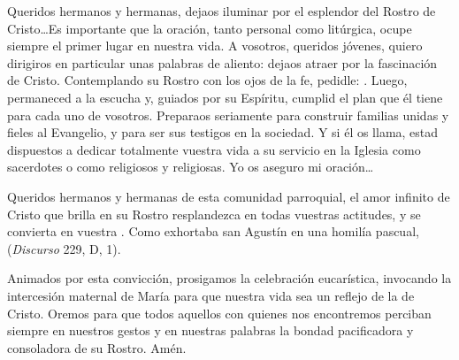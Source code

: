 \begin{body}
Queridos hermanos y hermanas, dejaos iluminar por el esplendor del Rostro de Cristo\ldots Es importante que la oración, tanto personal como litúrgica, ocupe siempre el primer lugar en nuestra vida. A vosotros, queridos jóvenes, quiero dirigiros en particular unas palabras de aliento: dejaos atraer por la fascinación de Cristo. Contemplando su Rostro con los ojos de la fe, pedidle: . Luego, permaneced a la escucha y, guiados por su Espíritu, cumplid el plan que él tiene para cada uno de vosotros. Preparaos seriamente para construir familias unidas y fieles al Evangelio, y para ser sus testigos en la sociedad. Y si él os llama, estad dispuestos a dedicar totalmente vuestra vida a su servicio en la Iglesia como sacerdotes o como religiosos y religiosas. Yo os aseguro mi oración\ldots

Queridos hermanos y hermanas de esta comunidad parroquial, el amor infinito de Cristo que brilla en su Rostro resplandezca en todas vuestras actitudes, y se convierta en vuestra . Como exhortaba san Agustín en una homilía pascual,  (\textit{Discurso} 229, D, 1).

Animados por esta convicción, prosigamos la celebración eucarística, invocando la intercesión maternal de María para que nuestra vida sea un reflejo de la de Cristo. Oremos para que todos aquellos con quienes nos encontremos perciban siempre en nuestros gestos y en nuestras palabras la bondad pacificadora y consoladora de su Rostro. Amén.
\end{body}

\label{b2-03-05-2012H}

